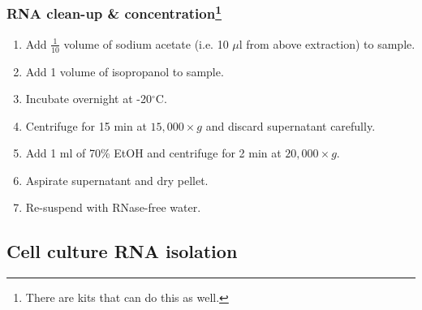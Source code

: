 \subsubsection*{RNA clean-up \& concentration\footnote{There are kits that can do this as well.}}
\begin{enumerate}
\item Add $\frac{1}{10}$ volume of sodium acetate (i.e. 10 $\mu$l from above extraction) to sample.
\item Add 1 volume of isopropanol to sample.
\item Incubate overnight at -20$^{\circ}$C.
\item Centrifuge for 15 min at $15,000 \times g$ and discard supernatant carefully.
\item Add 1 ml of 70\% EtOH and centrifuge for 2 min at $20,000 \times g$.
\item Aspirate supernatant and dry pellet.
\item Re-suspend with RNase-free water.
\end{enumerate}
  
\subsection{Cell culture RNA isolation}

